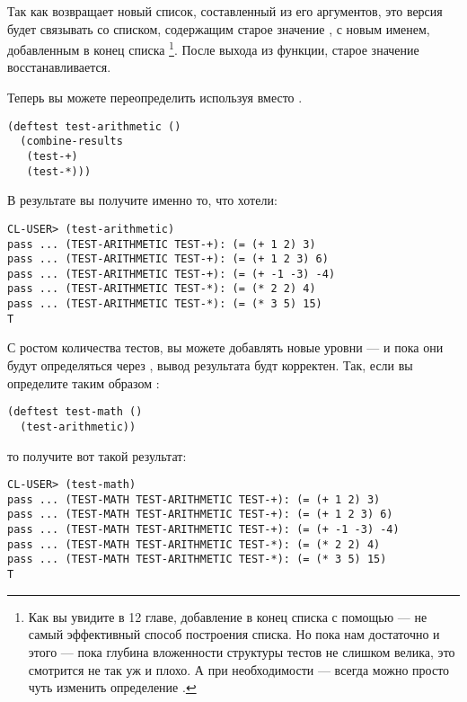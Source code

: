 Так как  возвращает новый список, составленный из его аргументов, это версия
будет связывать  со списком, содержащим старое значение
, с новым именем, добавленным в конец списка \footnote{Как вы увидите в
  12 главе, добавление в конец списка с помощью  --- не самый эффективный
  способ построения списка. Но пока нам достаточно и этого --- пока глубина вложенности
  структуры тестов не слишком велика, это смотрится не так уж и плохо. А при необходимости
  --- всегда можно просто чуть изменить определение .}. После выхода из
функции, старое значение  восстанавливается.

Теперь вы можете переопределить  используя  вместо
.

\begin{lstlisting}
(deftest test-arithmetic ()
  (combine-results
   (test-+)
   (test-*)))
\end{lstlisting}

В результате вы получите именно то, что хотели:

\begin{lstlisting}
CL-USER> (test-arithmetic)
pass ... (TEST-ARITHMETIC TEST-+): (= (+ 1 2) 3)
pass ... (TEST-ARITHMETIC TEST-+): (= (+ 1 2 3) 6)
pass ... (TEST-ARITHMETIC TEST-+): (= (+ -1 -3) -4)
pass ... (TEST-ARITHMETIC TEST-*): (= (* 2 2) 4)
pass ... (TEST-ARITHMETIC TEST-*): (= (* 3 5) 15)
T
\end{lstlisting}

С ростом количества тестов, вы можете добавлять новые уровни --- и пока они будут
определяться через , вывод результата будт корректен. Так, если вы
определите таким образом :

\begin{lstlisting}
(deftest test-math ()
  (test-arithmetic))
\end{lstlisting}

то получите вот такой результат:

\begin{lstlisting}
CL-USER> (test-math)
pass ... (TEST-MATH TEST-ARITHMETIC TEST-+): (= (+ 1 2) 3)
pass ... (TEST-MATH TEST-ARITHMETIC TEST-+): (= (+ 1 2 3) 6)
pass ... (TEST-MATH TEST-ARITHMETIC TEST-+): (= (+ -1 -3) -4)
pass ... (TEST-MATH TEST-ARITHMETIC TEST-*): (= (* 2 2) 4)
pass ... (TEST-MATH TEST-ARITHMETIC TEST-*): (= (* 3 5) 15)
T
\end{lstlisting}

